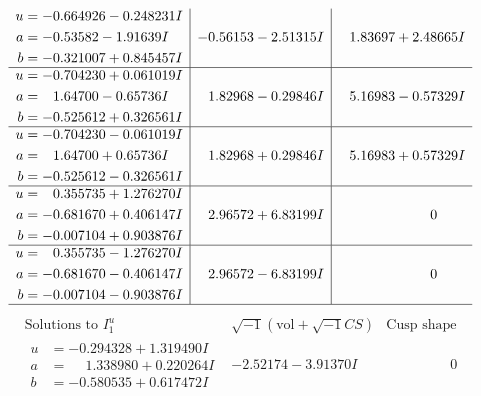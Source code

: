 \documentclass[1p]{elsarticle_modified}
\theoremstyle{definition}
\newcommand{\I}{\sqrt{-1}}
\begin{document}
$$\begin{array}{c|c|c}
\begin{aligned}
u &= -0.664926 - 0.248231 I \\
a &= -0.53582 - 1.91639 I \\
b &= -0.321007 + 0.845457 I\end{aligned}
 & -0.56153 - 2.51315 I & \phantom{-}1.83697 + 2.48665 I \\ \hline\begin{aligned}
u &= -0.704230 + 0.061019 I \\
a &= \phantom{-}1.64700 - 0.65736 I \\
b &= -0.525612 + 0.326561 I\end{aligned}
 & \phantom{-}1.82968 - 0.29846 I & \phantom{-}5.16983 - 0.57329 I \\ \hline\begin{aligned}
u &= -0.704230 - 0.061019 I \\
a &= \phantom{-}1.64700 + 0.65736 I \\
b &= -0.525612 - 0.326561 I\end{aligned}
 & \phantom{-}1.82968 + 0.29846 I & \phantom{-}5.16983 + 0.57329 I \\ \hline\begin{aligned}
u &= \phantom{-}0.355735 + 1.276270 I \\
a &= -0.681670 + 0.406147 I \\
b &= -0.007104 + 0.903876 I\end{aligned}
 & \phantom{-}2.96572 + 6.83199 I & \phantom{-0.000000 } 0 \\ \hline\begin{aligned}
u &= \phantom{-}0.355735 - 1.276270 I \\
a &= -0.681670 - 0.406147 I \\
b &= -0.007104 - 0.903876 I\end{aligned}
 & \phantom{-}2.96572 - 6.83199 I & \phantom{-0.000000 } 0\\
 \hline 
 \end{array}$$\newpage$$\begin{array}{c|c|c}  
\text{Solutions to }I^u_{1}& \I (\text{vol} + \sqrt{-1}CS) & \text{Cusp shape}\\
 \hline 
\begin{aligned}
u &= -0.294328 + 1.319490 I \\
a &= \phantom{-}1.338980 + 0.220264 I \\
b &= -0.580535 + 0.617472 I\end{aligned}
 & -2.52174 - 3.91370 I & \phantom{-0.000000 } 0 \\ \hline\begin{aligned}

\end{aligned}
\end{array}$$
\end{document}
